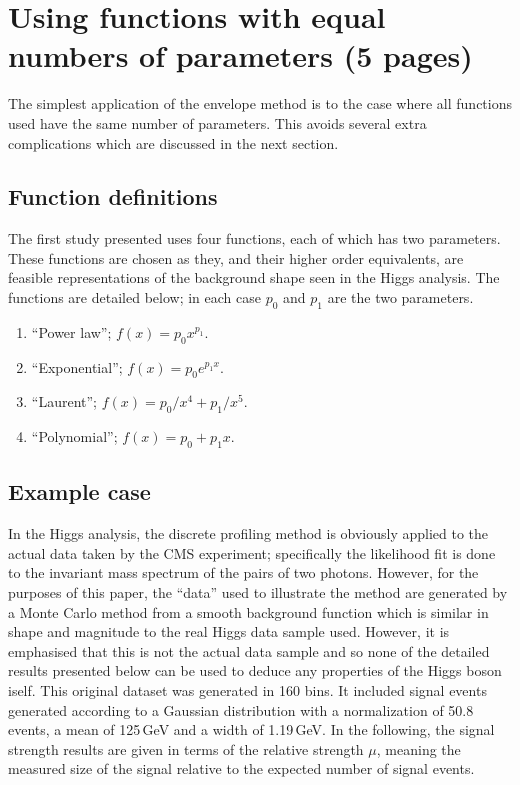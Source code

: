 \section{Using functions with equal numbers of parameters (5 pages)}
\label{sec:functions}

The simplest application of the envelope method is to the case where all
functions used have the same number of parameters. This avoids several extra
complications which are discussed in the next section.

\subsection{Function definitions}
\label{sec:functions:function}

The first study presented uses four functions, each of which has two parameters.
These functions are chosen as they, and their higher order equivalents,
are feasible representations of the background shape seen in the Higgs
analysis. The functions are detailed below; in each case $p_0$ and $p_1$ are
the two parameters.
\begin{enumerate}
\item
``Power law''; $f(x) = p_0 x^{p_1}$.
\item
``Exponential''; $f(x) = p_0 e^{p_1x}$.
\item
``Laurent''; $f(x) = p_0/x^4 + p_1/x^5$.
\item
``Polynomial''; $f(x) = p_0 + p_1 x$.
\end{enumerate}


\subsection{Example case}
\label{sec:functions:example}

In the Higgs analysis, the discrete profiling method is obviously applied to
the actual data taken by the CMS experiment; specifically the likelihood fit
is done to the invariant mass spectrum of the pairs of two photons.
However, for the purposes of this
paper, the ``data'' used to illustrate the method are generated by a Monte Carlo
method from a smooth background
function which is similar in shape and magnitude to the
real Higgs data sample used. However, it is emphasised that this is not the 
actual data sample and so 
none of the detailed results presented below can be used to deduce any
properties of the Higgs boson iself.
This original dataset was generated in 160 bins. It included signal events
generated according to a Gaussian distribution with a normalization of 50.8 events, a mean of 125\,GeV and a 
width of 1.19\,GeV. In the following, the signal strength results are given in
terms of the relative strength $\mu$, 
meaning the measured size of the signal relative
to the expected number of signal events.

